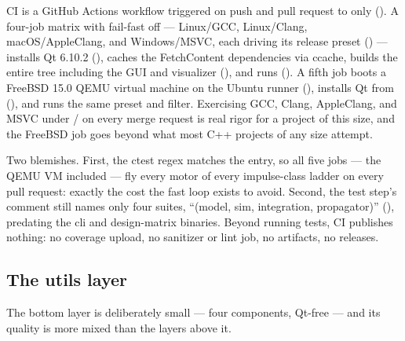 CI is a GitHub Actions workflow triggered on push and pull request to 
only (). A four-job matrix with
fail-fast off --- Linux/GCC, Linux/Clang, macOS/AppleClang, and Windows/MSVC, each driving
its release preset () --- installs Qt
6.10.2 (), caches the FetchContent
dependencies via ccache, builds the entire tree including the GUI and visualizer
(), and runs
 (). A
fifth job boots a FreeBSD 15.0 QEMU virtual machine on the Ubuntu runner
(), installs Qt from 
(), and runs the same preset and
filter. Exercising GCC, Clang, AppleClang, and MSVC under / on
every merge request is real rigor for a project of this size, and the FreeBSD job goes
beyond what most C++ projects of any size attempt.

Two blemishes. First, the ctest regex matches the  entry, so all five jobs ---
the QEMU VM included --- fly every motor of every impulse-class ladder on every pull
request: exactly the cost the  fast loop exists to avoid. Second, the test
step's comment still names only four suites, ``(model, sim, integration, propagator)''
(), predating the cli and design-matrix
binaries. Beyond running tests, CI publishes nothing: no coverage upload, no sanitizer or
lint job, no artifacts, no releases.

\subsection{The utils layer}\label{sec:testing-utils}

The bottom layer is deliberately small --- four components, Qt-free --- and its quality is
more mixed than the layers above it.

